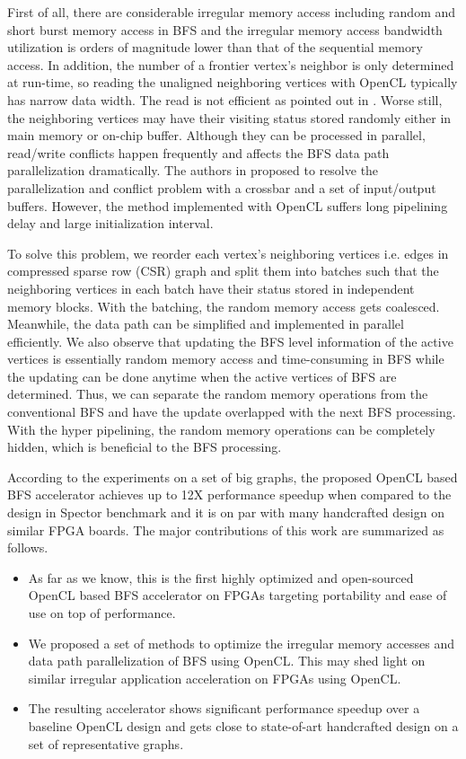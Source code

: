 First of all, there are considerable irregular memory access including 
random and short burst memory access in BFS and the irregular memory access 
bandwidth utilization is orders of magnitude lower than that of the sequential 
memory access. In addition, the number of a 
frontier vertex's neighbor is only determined at run-time, so reading the unaligned 
neighboring vertices with OpenCL typically has narrow data width. The read is not efficient 
as pointed out in \cite{wang2017multikernel}. Worse still, the neighboring vertices 
may have their visiting status stored randomly either in main memory or on-chip buffer.
Although they can be processed in parallel, read/write conflicts happen frequently 
and affects the BFS data path parallelization dramatically. 
The authors in \cite{ham2016graphicionado} 
proposed to resolve the parallelization and conflict problem with a 
crossbar and a set of input/output buffers. However, the method implemented 
with OpenCL suffers long pipelining delay and large initialization interval. 

To solve this problem, we reorder each vertex's neighboring vertices i.e. 
edges in compressed sparse row (CSR) graph and split them into 
batches such that the neighboring vertices 
in each batch have their status stored in independent memory blocks. 
With the batching, the random memory access gets coalesced. Meanwhile, 
the data path can be simplified and implemented in parallel efficiently. 
We also observe that updating the BFS level information of the 
active vertices is essentially random memory access and time-consuming 
in BFS while the updating can be done anytime when the active vertices of BFS 
are determined. Thus, we can separate the random memory operations from
the conventional BFS and have the update overlapped with the next BFS processing. 
With the hyper pipelining, the random memory operations can be completely 
hidden, which is beneficial to the BFS processing.

According to the experiments on a set of big graphs, the proposed OpenCL based BFS 
accelerator achieves up to 12X performance speedup when compared to the design 
in Spector benchmark and it is on par with many handcrafted design on similar FPGA boards. 
The major contributions of this work are summarized as follows.
\begin{itemize}
    \item As far as we know, this is the first highly optimized and open-sourced 
		OpenCL based BFS accelerator on FPGAs targeting portability and ease of 
		use on top of performance. 
    \item We proposed a set of methods to optimize the irregular
		memory accesses and data path parallelization of BFS using OpenCL. 
		This may shed light on similar irregular application acceleration on 
		FPGAs using OpenCL.
    \item The resulting accelerator shows significant performance speedup 
        over a baseline OpenCL design and gets close to state-of-art handcrafted 
		design on a set of representative graphs.
\end{itemize}

